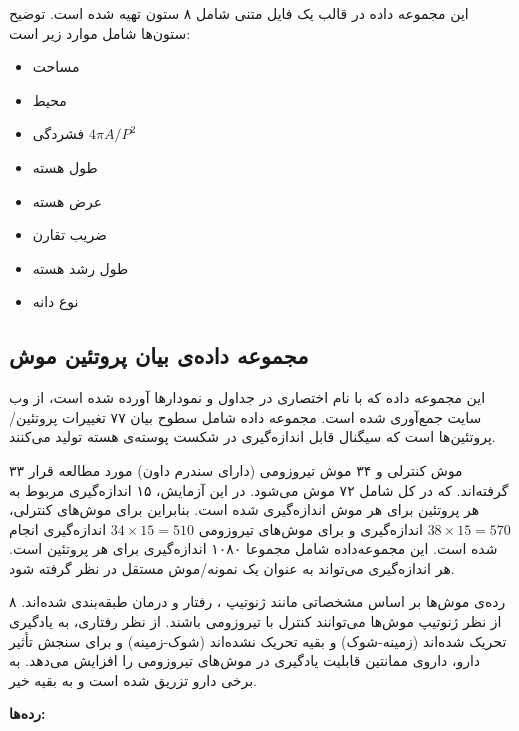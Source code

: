 این مجموعه داده در قالب یک فایل متنی شامل ۸ ستون تهیه شده است. توضیح ستون‌ها شامل موارد زیر است:

\begin{itemize}
\item
{}
مساحت
\item
{}
محیط
\item
{}
فشردگی 
$4 \pi A / P^2$
\item
{}
طول هسته
\item
{}
عرض هسته
\item
{}
ضریب تقارن
\item
{}
طول رشد هسته
\item
{}
نوع دانه
\end{itemize}

\subsection{
مجموعه داده‌ی بیان پروتئین موش
}

این مجموعه داده که با نام اختصاری 
در جداول و نمودارها آورده شده است، از وب سایت
\cite{uci_MPE}
جمع‌آوری شده است. مجموعه داده شامل سطوح بیان ۷۷ تغییرات پروتئین/پروتئین‌ها است که سیگنال قابل اندازه‌گیری در شکست پوسته‌ی هسته تولید می‌کنند.

۳۳ موش کنترلی و ۳۴ موش تیروزومی
(دارای سندرم داون) مورد مطالعه قرار گرفته‌اند. که در کل شامل ۷۲ موش می‌شود. در این آزمایش، ۱۵ اندازه‌گیری مربوط به هر پروتئین برای هر موش اندازه‌گیری شده است. بنابراین برای موش‌های کنترلی، 
$38 \times 15 = 570$
اندازه‌گیری و برای موش‌های تیروزومی 
$34 \times 15 = 510$
اندازه‌گیری انجام شده است. این مجموعه‌داده شامل مجموعا ۱۰۸۰ اندازه‌گیری برای هر پروتئین است. هر اندازه‌گیری می‌تواند به عنوان یک نمونه/موش مستقل در نظر گرفته شود.

۸ رده‌ی موش‌ها بر اساس مشخصاتی مانند ژنوتیپ
، رفتار و درمان طبقه‌بندی شده‌اند. از نظر ژنوتیپ موش‌ها می‌توانند کنترل با تیروزومی باشند. از نظر رفتاری، به یادگیری تحریک شده‌اند (زمینه-شوک)
 و بقیه تحریک نشده‌اند (شوک-زمینه) و برای سنجش تأثیر دارو، داروی ممانتین%
قابلیت یادگیری در موش‌های تیروزومی را افزایش می‌دهد. به برخی دارو تزریق شده است و به بقیه خیر.

\textbf{
رده‌ها:
}

